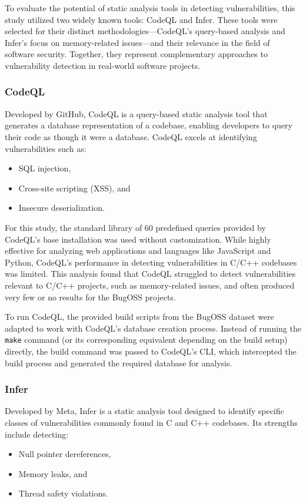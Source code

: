 To evaluate the potential of static analysis tools in detecting vulnerabilities, this study utilized two widely known tools: CodeQL and Infer. These tools were selected for their distinct methodologies—CodeQL's query-based analysis and Infer's focus on memory-related issues—and their relevance in the field of software security. Together, they represent complementary approaches to vulnerability detection in real-world software projects.

\subsubsection{CodeQL}
Developed by GitHub, CodeQL is a query-based static analysis tool that generates a database representation of a codebase, enabling developers to query their code as though it were a database. CodeQL excels at identifying vulnerabilities such as:
\begin{itemize}
    \item SQL injection,
    \item Cross-site scripting (XSS), and
    \item Insecure deserialization.
\end{itemize}

For this study, the standard library of 60 predefined queries provided by CodeQL's base installation was used without customization. While highly effective for analyzing web applications and languages like JavaScript and Python, CodeQL's performance in detecting vulnerabilities in C/C++ codebases was limited. This analysis found that CodeQL struggled to detect vulnerabilities relevant to C/C++ projects, such as memory-related issues, and often produced very few or no results for the BugOSS projects.

To run CodeQL, the provided build scripts from the BugOSS dataset were adapted to work with CodeQL's database creation process. Instead of running the \texttt{make} command (or its corresponding equivalent depending on the build setup) directly, the build command was passed to CodeQL's CLI, which intercepted the build process and generated the required database for analysis.

\subsubsection{Infer}
Developed by Meta, Infer is a static analysis tool designed to identify specific classes of vulnerabilities commonly found in C and C++ codebases. Its strengths include detecting:
\begin{itemize}
    \item Null pointer dereferences,
    \item Memory leaks, and
    \item Thread safety violations.
\end{itemize}

